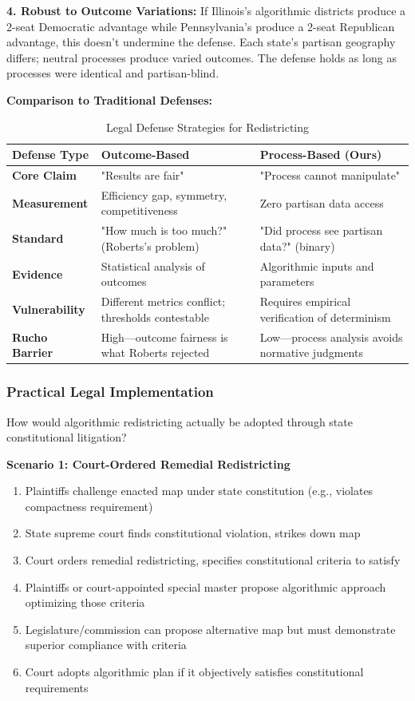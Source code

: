 \textbf{4. Robust to Outcome Variations:} If Illinois's algorithmic districts produce a 2-seat Democratic advantage while Pennsylvania's produce a 2-seat Republican advantage, this doesn't undermine the defense. Each state's partisan geography differs; neutral processes produce varied outcomes. The defense holds as long as processes were identical and partisan-blind.

\textbf{Comparison to Traditional Defenses:}

\begin{table}[h]
\centering
\caption{Legal Defense Strategies for Redistricting}
\label{tab:legal_defenses}
\small
\begin{tabular}{p{3cm}p{4.5cm}p{4.5cm}}
\toprule
\textbf{Defense Type} & \textbf{Outcome-Based} & \textbf{Process-Based (Ours)} \\
\midrule
\textbf{Core Claim} & "Results are fair" & "Process cannot manipulate" \\
\textbf{Measurement} & Efficiency gap, symmetry, competitiveness & Zero partisan data access \\
\textbf{Standard} & "How much is too much?" (Roberts's problem) & "Did process see partisan data?" (binary) \\
\textbf{Evidence} & Statistical analysis of outcomes & Algorithmic inputs and parameters \\
\textbf{Vulnerability} & Different metrics conflict; thresholds contestable & Requires empirical verification of determinism \\
\textbf{Rucho Barrier} & High—outcome fairness is what Roberts rejected & Low—process analysis avoids normative judgments \\
\bottomrule
\end{tabular}
\end{table}

\subsubsection{Practical Legal Implementation}

How would algorithmic redistricting actually be adopted through state constitutional litigation?

\textbf{Scenario 1: Court-Ordered Remedial Redistricting}

\begin{enumerate}
\item Plaintiffs challenge enacted map under state constitution (e.g., violates compactness requirement)
\item State supreme court finds constitutional violation, strikes down map
\item Court orders remedial redistricting, specifies constitutional criteria to satisfy
\item Plaintiffs or court-appointed special master propose algorithmic approach optimizing those criteria
\item Legislature/commission can propose alternative map but must demonstrate superior compliance with criteria
\item Court adopts algorithmic plan if it objectively satisfies constitutional requirements
\end{enumerate}

